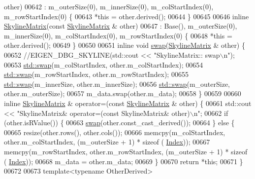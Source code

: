 \begin{DoxyCode}
       other)
00642     : m\_outerSize(0), m\_innerSize(0), m\_colStartIndex(0), m\_rowStartIndex(0) \{
00643         *\textcolor{keyword}{this} = other.derived();
00644     \}
00645 
00646     \textcolor{keyword}{inline} \hyperlink{class_eigen_1_1_skyline_matrix}{SkylineMatrix}(\textcolor{keyword}{const} \hyperlink{class_eigen_1_1_skyline_matrix}{SkylineMatrix} & other)
00647     : Base(), m\_outerSize(0), m\_innerSize(0), m\_colStartIndex(0), m\_rowStartIndex(0) \{
00648         *\textcolor{keyword}{this} = other.derived();
00649     \}
00650 
00651     \textcolor{keyword}{inline} \textcolor{keywordtype}{void} \hyperlink{endian_8c_a3ca5ecd34b04d6a243c054ac3a57f68d}{swap}(\hyperlink{class_eigen_1_1_skyline_matrix}{SkylineMatrix} & other) \{
00652         \textcolor{comment}{//EIGEN\_DBG\_SKYLINE(std::cout << "SkylineMatrix:: swap\(\backslash\)n");}
00653         \hyperlink{endian_8c_a3ca5ecd34b04d6a243c054ac3a57f68d}{std::swap}(m\_colStartIndex, other.m\_colStartIndex);
00654         \hyperlink{endian_8c_a3ca5ecd34b04d6a243c054ac3a57f68d}{std::swap}(m\_rowStartIndex, other.m\_rowStartIndex);
00655         \hyperlink{endian_8c_a3ca5ecd34b04d6a243c054ac3a57f68d}{std::swap}(m\_innerSize, other.m\_innerSize);
00656         \hyperlink{endian_8c_a3ca5ecd34b04d6a243c054ac3a57f68d}{std::swap}(m\_outerSize, other.m\_outerSize);
00657         m\_data.swap(other.m\_data);
00658     \}
00659 
00660     \textcolor{keyword}{inline} \hyperlink{class_eigen_1_1_skyline_matrix}{SkylineMatrix} & operator=(\textcolor{keyword}{const} \hyperlink{class_eigen_1_1_skyline_matrix}{SkylineMatrix} & other) \{
00661         std::cout << \textcolor{stringliteral}{"SkylineMatrix& operator=(const SkylineMatrix& other)\(\backslash\)n"};
00662         \textcolor{keywordflow}{if} (other.isRValue()) \{
00663             \hyperlink{endian_8c_a3ca5ecd34b04d6a243c054ac3a57f68d}{swap}(other.const\_cast\_derived());
00664         \} \textcolor{keywordflow}{else} \{
00665             resize(other.rows(), other.cols());
00666             memcpy(m\_colStartIndex, other.m\_colStartIndex, (m\_outerSize + 1) * sizeof (
      \hyperlink{group___core___module_a554f30542cc2316add4b1ea0a492ff02}{Index}));
00667             memcpy(m\_rowStartIndex, other.m\_rowStartIndex, (m\_outerSize + 1) * sizeof (
      \hyperlink{group___core___module_a554f30542cc2316add4b1ea0a492ff02}{Index}));
00668             m\_data = other.m\_data;
00669         \}
00670         \textcolor{keywordflow}{return} *\textcolor{keyword}{this};
00671     \}
00672 
00673     \textcolor{keyword}{template}<\textcolor{keyword}{typename} OtherDerived>

\end{DoxyCode}
